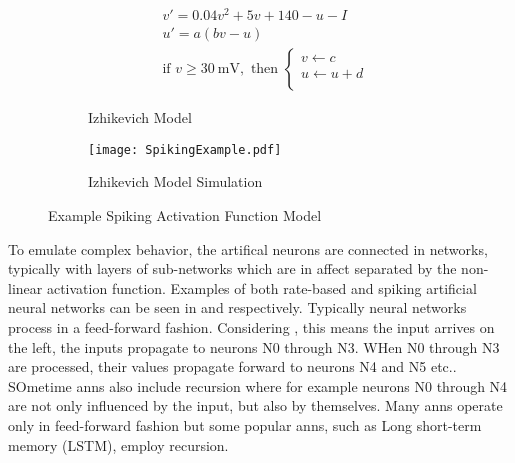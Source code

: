 \begin{figure}
\centering
\captionsetup{justification=centering}
\vspace{0.5cm}
\begin{subfigure}{.9\textwidth}
  \centering
  \begin{equation}
    \begin{split}
    &v' = 0.04v^2+5v + 140 - u - I\\
    &u' = a(bv-u)  \\
    &\text{if } v\ge  \SI{30}{\mV}, \text{ then } 
    \begin{cases}
        v \leftarrow c\\           
        u \leftarrow u+d\\           
    \end{cases} \nonumber
    \end{split}
  \end{equation}
  \caption{Izhikevich Model\cite{Iz2005}}
  \label{fig:Izhikevich Model}
  \end{subfigure}
\begin{subfigure}{.7\textwidth}
  \centering
  \mbox{\texttt{[image: SpikingExample.pdf]}}
  \captionsetup{justification=centering, skip=3pt}
  \caption{Izhikevich \cite{Iz2005} Model Simulation}
  \label{fig:spiking example}
\end{subfigure}
\caption{Example Spiking Activation Function Model}
\label{fig:Example Spiking Model}
\end{figure}

To emulate complex behavior, the artifical neurons are connected in networks, typically with layers of sub-networks which are in affect separated by the non-linear activation function.
Examples of both rate-based and spiking artificial neural networks can be seen in  and  respectively.
Typically neural networks process in a feed-forward fashion. Considering , this means the input arrives on the left, the inputs propagate to neurons N0 through N3. WHen N0 through N3 are processed, their values propagate forward to neurons N4 and N5 etc.. SOmetime \ac{ann}s also include recursion where for example neurons N0 through N4 are not only influenced
by the input, but also by themselves. Many \ac{ann}s operate only in feed-forward fashion but some popular \ac{ann}s, such as Long short-term memory (LSTM), employ recursion.

